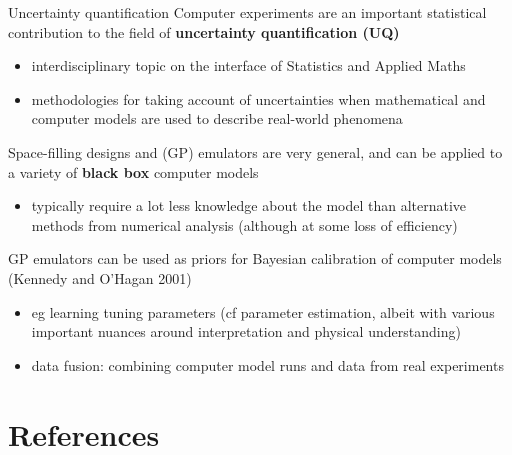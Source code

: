 \documentclass[
  ignorenonframetext,
]{beamer}
\providecommand{\tightlist}{%
  \setlength{\itemsep}{0pt}\setlength{\parskip}{0pt}}
\begin{document}
\begin{frame}{Uncertainty quantification}
\protect\hypertarget{uncertainty-quantification}{}
Computer experiments are an important statistical contribution to the
field of \textbf{uncertainty quantification (UQ)}

\begin{itemize}
\tightlist
\item
  interdisciplinary topic on the interface of Statistics and Applied
  Maths
\item
  methodologies for taking account of uncertainties when mathematical
  and computer models are used to describe real-world phenomena
\end{itemize}

Space-filling designs and (GP) emulators are very general, and can be
applied to a variety of \textbf{black box} computer models

\begin{itemize}
\tightlist
\item
  typically require a lot less knowledge about the model than
  alternative methods from numerical analysis (although at some loss of
  efficiency)
\end{itemize}

GP emulators can be used as priors for Bayesian calibration of computer
models (Kennedy and O'Hagan 2001)

\begin{itemize}
\tightlist
\item
  eg learning tuning parameters (cf parameter estimation, albeit with
  various important nuances around interpretation and physical
  understanding)
\item
  data fusion: combining computer model runs and data from real
  experiments
\end{itemize}
\end{frame}

\hypertarget{references}{%
\section{References}\label{references}}
\end{document}
